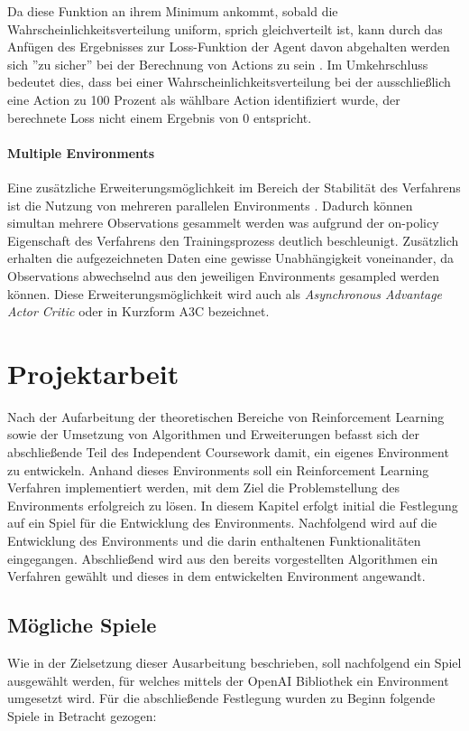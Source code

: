 \documentclass[11pt]{scrartcl}
\begin{document}
Da diese Funktion an ihrem Minimum ankommt, sobald die Wahrscheinlichkeitsverteilung uniform,
sprich gleichverteilt ist, kann durch das Anfügen des Ergebnisses zur Loss-Funktion der
Agent davon abgehalten werden sich ''zu sicher'' bei der Berechnung von Actions zu sein 
\cite[~S.269 f.]{L2018}. Im Umkehrschluss bedeutet dies, dass bei einer
Wahrscheinlichkeitsverteilung bei der ausschließlich eine Action zu 100 Prozent als wählbare
Action identifiziert wurde, der berechnete Loss nicht einem Ergebnis von 0 entspricht.

\paragraph*{Multiple Environments} 
\label{sec:multiple_envs}
\noindent
\newline
Eine zusätzliche Erweiterungsmöglichkeit im Bereich der Stabilität des Verfahrens ist die Nutzung
von mehreren parallelen Environments \cite[~S.270]{L2018}. Dadurch können simultan mehrere
Observations gesammelt werden was aufgrund der on-policy Eigenschaft des Verfahrens den
Trainingsprozess deutlich beschleunigt. Zusätzlich erhalten die aufgezeichneten Daten eine
gewisse Unabhängigkeit voneinander, da Observations abwechselnd aus den jeweiligen Environments
gesampled werden können. Diese Erweiterungsmöglichkeit wird auch als \textit{Asynchronous Advantage
Actor Critic} oder in Kurzform A3C bezeichnet.

\newpage
\section{Projektarbeit}
Nach der Aufarbeitung der theoretischen Bereiche von Reinforcement Learning sowie der Umsetzung von
Algorithmen und Erweiterungen befasst sich der abschließende Teil des Independent Coursework damit,
ein eigenes Environment zu entwickeln. Anhand dieses Environments soll ein Reinforcement Learning
Verfahren implementiert werden, mit dem Ziel die Problemstellung des Environments erfolgreich zu 
lösen. In diesem Kapitel erfolgt initial die Festlegung auf ein Spiel für die Entwicklung des
Environments. Nachfolgend wird auf die Entwicklung des Environments und die darin enthaltenen
Funktionalitäten eingegangen. Abschließend wird aus den bereits vorgestellten Algorithmen ein
Verfahren gewählt und dieses in dem entwickelten Environment angewandt. 

\subsection{Mögliche Spiele}
Wie in der Zielsetzung dieser Ausarbeitung beschrieben, soll nachfolgend ein Spiel ausgewählt werden,
für welches mittels der OpenAI Bibliothek ein Environment umgesetzt wird. Für die abschließende
Festlegung wurden zu Beginn folgende Spiele in Betracht gezogen:
\end{document}
